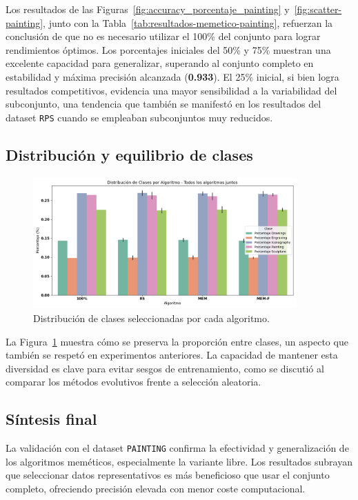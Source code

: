 Los resultados de las Figuras~\ref{fig:accuracy_porcentaje_painting} y~\ref{fig:scatter-painting}, junto con la Tabla~\ref{tab:resultados-memetico-painting},
refuerzan la conclusión de que no es necesario utilizar el 100\% del conjunto para lograr rendimientos óptimos.
Los porcentajes iniciales del 50\% y 75\% muestran una excelente capacidad para generalizar,
superando al conjunto completo en estabilidad y máxima precisión alcanzada (\textbf{0.933}).
El 25\% inicial, si bien logra resultados competitivos, evidencia una mayor sensibilidad a la variabilidad del subconjunto,
una tendencia que también se manifestó en los resultados del dataset \texttt{RPS} cuando se empleaban subconjuntos muy reducidos.


\subsection{Distribución y equilibrio de clases}

\begin{figure}[htp]
    \centering
    \includegraphics[width=0.9\textwidth]{imagenes/evaluaciones/painting/balance-de-clases-por-algoritmo.png}
    \caption{Distribución de clases seleccionadas por cada algoritmo.}
    \label{fig:balance_clases_painting}
\end{figure}

La Figura~\ref{fig:balance_clases_painting} muestra cómo se preserva la proporción entre clases,
un aspecto que también se respetó en experimentos anteriores.
La capacidad de mantener esta diversidad es clave para evitar sesgos de entrenamiento,
como se discutió al comparar los métodos evolutivos frente a selección aleatoria.

\subsection{Síntesis final}
La validación con el dataset \texttt{PAINTING} confirma la efectividad y generalización de los algoritmos meméticos, especialmente la variante libre.
Los resultados subrayan que seleccionar datos representativos es más beneficioso que usar el conjunto completo, ofreciendo precisión elevada con menor coste computacional.

